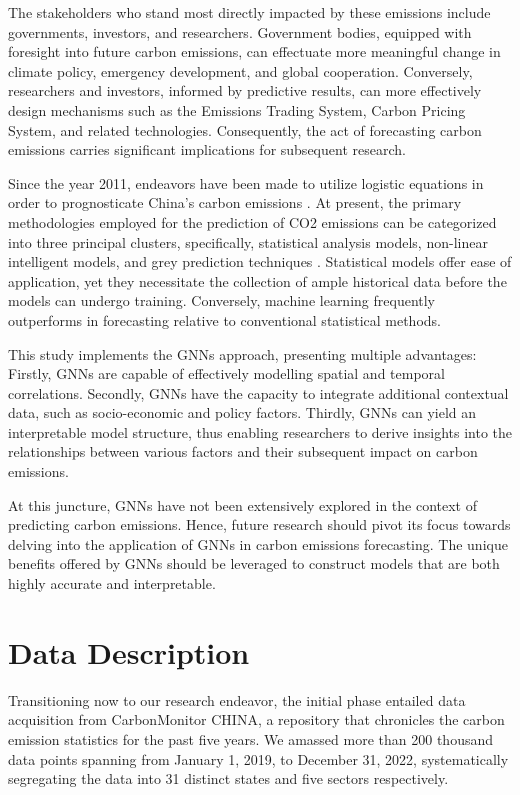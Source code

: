 \documentclass[sigconf, authordraft]{acmart}
\begin{document}
	The stakeholders who stand most directly impacted by these emissions include governments,
	investors, and researchers. Government bodies, equipped with foresight into future
	carbon emissions, can effectuate more meaningful change in climate policy, emergency
	development, and global cooperation. Conversely, researchers and investors, informed
	by predictive results, can more effectively design mechanisms such as the
	Emissions Trading System, Carbon Pricing System, and related technologies. Consequently,
	the act of forecasting carbon emissions carries significant implications for
	subsequent research.

	Since the year 2011, endeavors have been made to utilize logistic equations in
	order to prognosticate China's carbon emissions \cite{meng2011-modeling}. At
	present, the primary methodologies employed for the prediction of CO2 emissions
	can be categorized into three principal clusters, specifically, statistical analysis
	models, non-linear intelligent models, and grey prediction techniques \cite{gao2021-novel}.
	Statistical models offer ease of application, yet they necessitate the collection
	of ample historical data before the models can undergo training. Conversely, machine
	learning frequently outperforms in forecasting relative to conventional statistical
	methods.

	This study implements the GNNs approach, presenting multiple advantages: Firstly,
	GNNs are capable of effectively modelling spatial and temporal correlations. Secondly,
	GNNs have the capacity to integrate additional contextual data, such as socio-economic
	and policy factors. Thirdly, GNNs can yield an interpretable model structure,
	thus enabling researchers to derive insights into the relationships between
	various factors and their subsequent impact on carbon emissions\cite{alam2021-forecasting}.

	At this juncture, GNNs have not been extensively explored in the context of
	predicting carbon emissions. Hence, future research should pivot its focus
	towards delving into the application of GNNs in carbon emissions forecasting. The
	unique benefits offered by GNNs should be leveraged to construct models that are
	both highly accurate and interpretable.

	\section{Data Description}
	Transitioning now to our research endeavor, the initial phase entailed data
	acquisition from CarbonMonitor CHINA, a repository that chronicles the carbon emission
	statistics for the past five years. We amassed more than 200 thousand data
	points spanning from January 1, 2019, to December 31, 2022, systematically
	segregating the data into 31 distinct states and five sectors respectively.
\end{document}
